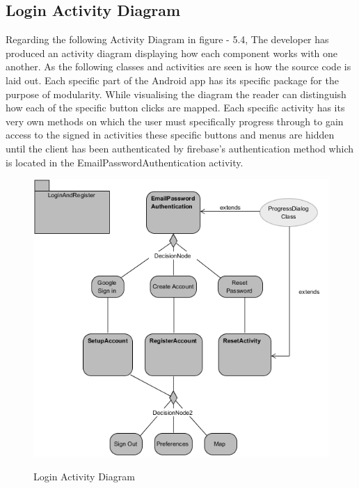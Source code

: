 \subsection{Login Activity Diagram}
Regarding the following Activity Diagram in figure - 5.4, The developer has produced an activity diagram displaying how each component works with one another. As the following classes and activities are seen is how the source code is laid out. Each specific part of the Android app has its specific package for the purpose of modularity. While visualising the diagram the reader can distinguish how each of the specific button clicks are mapped. Each specific activity has its very own methods on which the user must specifically progress through to gain access to the signed in activities these specific buttons and menus are hidden until the client has been authenticated by firebase's authentication method which is located in the EmailPasswordAuthentication activity.
\begin{figure}[htbp]
    \center \includegraphics[width=450pt]{Login&RegisterActivity}\\
    \caption{Login Activity Diagram } \label{Figure: Login Activity Diagram}
\end{figure}

